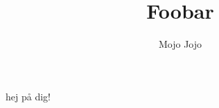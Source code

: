 \documentclass{scrartcl}
\begin{document}
\title{Foobar}
\author{Mojo Jojo}
hej på dig!
\maketitle
\end{document}
